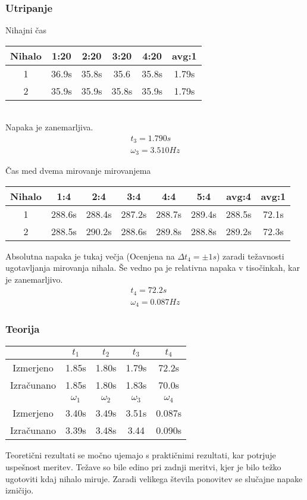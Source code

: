\documentclass[a4paper]{article}
\begin{document}
\subsubsection{Utripanje}
Nihajni čas
\begin{table}[h]
  \centering
\begin{tabular}{*{6}{c}}
  Nihalo & 1:20 & 2:20 & 3:20 & 4:20 & avg:1\\\toprule
  1 & 36.9s & 35.8s & 35.6 & 35.8s & 1.79s \\\midrule
  2 & 35.9s & 35.9s & 35.8s & 35.9s & 1.79s \\\bottomrule
\end{tabular}
\end{table}\\
Napaka je zanemarljiva.
\begin{align*}
  t_3=1.790s\\
  \omega_3=3.510Hz
\end{align*}

Čas med dvema mirovanje mirovanjema
\begin{table}[h]
  \centering
  \begin{tabular}{*{8}{c}}
    Nihalo & 1:4 & 2:4 & 3:4 & 4:4 & 5:4 & avg:4 & avg:1 \\\toprule
    1 & 288.6s & 288.4s & 287.2s & 288.7s & 289.4s & 288.5s & 72.1s\\\midrule
    2 & 288.5s & 290.2s & 288.6s & 289.8s & 288.8s & 289.2s & 72.3s \\\bottomrule
  \end{tabular}
\end{table}
Absolutna napaka je tukaj večja (Ocenjena na \(\Delta t_4 = \pm 1s\)) zaradi težavnosti ugotavljanja mirovanja nihala. Še vedno pa je relativna napaka v tisočinkah, kar je zanemarljivo.
\begin{align*}
  t_4 = 72.2s\\
  \omega_4 = 0.087Hz
\end{align*}
\subsubsection{Teorija}
\begin{table}[h]
  \centering
  \begin{tabular}{*{5}{c}}\toprule
    & $t_1$ & $t_2$ & $t_3$ & $t_4$ \\\midrule
    Izmerjeno & 1.85s & 1.80s & 1.79s & 72.2s \\
    Izračunano & 1.85s & 1.80s & 1.83s & 70.0s\\\toprule
    & $\omega_1$ & $\omega_2$ & $\omega_3$ & $\omega_4$ \\\midrule
    Izmerjeno & 3.40s & 3.49s & 3.51s & 0.087s \\
    Izračunano & 3.39s & 3.48s & 3.44 & 0.090s \\\bottomrule
  \end{tabular}
\end{table}
Teoretični rezultati se močno ujemajo s praktičnimi rezultati, kar potrjuje uspešnost meritev. Težave so bile edino pri zadnji meritvi, kjer je bilo težko ugotoviti kdaj nihalo miruje. Zaradi velikega števila ponovitev se slučajne napake izničijo.
\end{document}
